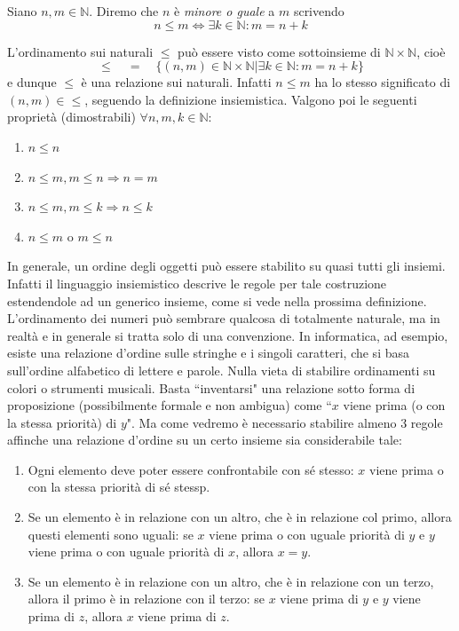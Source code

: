 \documentclass[oneside]{book}
\theoremstyle{remark}
\begin{document}
\begin{tcolorbox}[colback=yellow!30, colframe=yellow!30!black, title={Ordinamento in $\mathbb{N}$}]
Siano $n,m\in\mathbb{N}$. Diremo che $n$ è \textit{minore o guale} a $m$
scrivendo
\[ n\leq m \Longleftrightarrow \exists k\in\mathbb{N}: m = n+k \]
\end{tcolorbox}
L'ordinamento sui naturali $\leq$ può essere visto come sottoinsieme
di $\mathbb{N}\times\mathbb{N}$, cioè \[ \leq \quad=\quad \{(n,m)\in\mathbb{N}\times\mathbb{N}|\exists k\in\mathbb{N}:m=n+k\} \]
e dunque $\leq$ è una relazione sui naturali. Infatti $n\leq m$ ha
lo stesso significato di $(n,m)\in\leq$, seguendo la definizione
insiemistica. Valgono poi le seguenti proprietà
(dimostrabili) $\forall n,m,k\in\mathbb{N}$:
\begin{enumerate}
\item $n\leq n$
\item $n\leq m, m\leq n \Longrightarrow n = m$
\item $n\leq m, m\leq k \Longrightarrow n \leq k$
\item $n\leq m \text{ o } m\leq n$
\end{enumerate}

In generale, un ordine degli oggetti può essere stabilito su
quasi tutti gli insiemi. Infatti il linguaggio insiemistico
descrive le regole per tale costruzione estendendole ad un
generico insieme, come si vede nella prossima definizione.
L'ordinamento dei numeri può sembrare qualcosa di totalmente
naturale, ma in realtà e in generale si tratta solo di una
convenzione. In informatica, ad esempio, esiste una relazione
d'ordine sulle stringhe e i singoli caratteri, che si basa
sull'ordine alfabetico di lettere e parole. Nulla vieta di
stabilire ordinamenti su colori o strumenti musicali. Basta
``inventarsi" una relazione sotto forma di proposizione (possibilmente
formale e non ambigua) come ``$x$ viene prima (o con la stessa
priorità) di $y$". Ma come vedremo è necessario stabilire almeno 3 regole
affinche una relazione d'ordine su un certo insieme sia considerabile tale:
\begin{enumerate}
    \item Ogni elemento deve poter essere confrontabile con sé stesso: $x$ viene prima o con la stessa priorità di sé stessp.
    \item Se un elemento è in relazione con un altro, che è in relazione col primo, allora questi elementi sono uguali: se $x$ viene prima o con uguale priorità di $y$ e $y$ viene prima o con uguale priorità di $x$, allora $x = y$.
    \item Se un elemento è in relazione con un altro, che è in relazione con un terzo, allora il primo è in relazione con il terzo: se $x$ viene prima di $y$ e $y$ viene prima di $z$, allora $x$ viene prima di $z$.
\end{enumerate}
\end{document}
